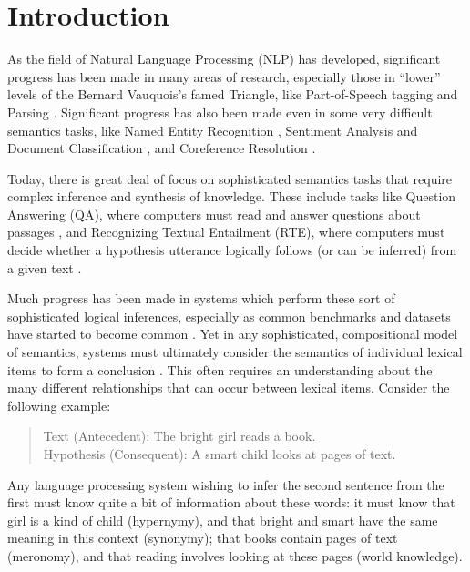 \documentclass[12pt]{article}
\begin{document}
\tableofcontents
\pagebreak

\section{Introduction}
\label{sec:intro}

As the field of Natural Language Processing (NLP) has developed, significant
progress has been made in many areas of research, especially those in ``lower''
levels of the Bernard Vauquois's famed Triangle, like Part-of-Speech tagging
\cite{toutanova:2003:naacl} and Parsing \cite{chen:2014:emnlp}.  Significant progress
has also been made even in some very difficult semantics tasks,
like Named Entity Recognition \cite{needcite}, Sentiment Analysis
\cite{socher:2013:nips} and Document Classification \cite{zhang:2016:naacl},
and Coreference Resolution \cite{durrett:2013:emnlp}.

Today, there is great deal of focus on sophisticated semantics tasks that
require complex inference and synthesis of knowledge. These include tasks like
Question Answering (QA), where computers must read and answer questions about
passages \cite{hermann:2015:nips,weston:2016:iclr}, and Recognizing Textual
Entailment (RTE), where computers must decide whether a hypothesis utterance
logically follows (or can be inferred) from a given text
\cite{dagan:2006:mlc,marelli:2014:semeval,bowman:2015:emnlp}.

Much progress has been made in systems which perform these sort of
sophisticated logical inferences, especially as common benchmarks and datasets
have started to become common
\cite{dagan:2006:mlc,giampiccolo:2007:pascal,bentivogli:2009:tac,marelli:2014:semeval,bowman:2015:emnlp}.
Yet in any sophisticated, compositional model of semantics, systems must
ultimately consider the semantics of individual lexical items to form a
conclusion \cite{montague:1970:theoria,kamp:2013:discourse}.  This often
requires an understanding about the many different relationships that can occur
between lexical items. Consider the following example:
\begin{quote}
  Text (Antecedent): The bright girl reads a book.\\
  Hypothesis (Consequent): A smart child looks at pages of text.
\end{quote}
Any language processing system wishing to infer the second sentence from the
first must know quite a bit of information about these words: it must know that
girl is a kind of child (hypernymy), and that bright and smart have the same
meaning in this context (synonymy); that books contain pages of text
(meronomy), and that reading involves looking at these pages (world knowledge).
\end{document}
